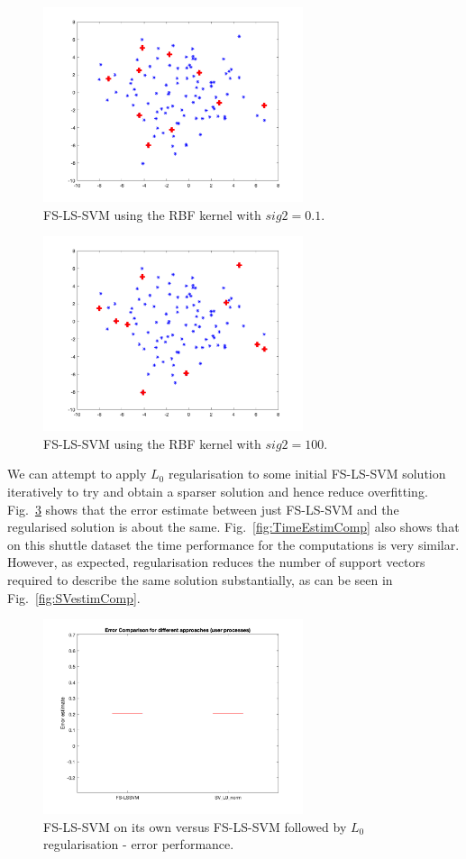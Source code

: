\documentclass[10pt,a4paper]{article}
\begin{document}
\begin{figure}[h!]
\centering
  \includegraphics[width=3in]{FSsig01.png}
  \caption{FS-LS-SVM using the RBF kernel with $sig2=0.1$.}
  \label{fig:FSsig01}
\end{figure}

\begin{figure}[h!]
\centering
  \includegraphics[width=3in]{FSsig100.png}
  \caption{FS-LS-SVM using the RBF kernel with $sig2=100$.}
  \label{fig:FSsig100}
\end{figure}

We can attempt to apply $L_0$ regularisation to some initial FS-LS-SVM solution iteratively to try and obtain a sparser solution and hence reduce overfitting. Fig.~\ref{fig:errorEstimComp} shows that the error estimate between just FS-LS-SVM and the regularised solution is about the same. Fig.~\ref{fig:TimeEstimComp} also shows that on this shuttle dataset the time performance for the computations is very similar. However, as expected, regularisation reduces the number of support vectors required to describe the same solution substantially, as can be seen in Fig.~\ref{fig:SVestimComp}.

\begin{figure}[h!]
\centering
  \includegraphics[width=3in]{errorEstimComp.png}
  \caption{FS-LS-SVM on its own versus FS-LS-SVM followed by $L_0$ regularisation - error performance.}
  \label{fig:errorEstimComp}
\end{figure}
\end{document}
